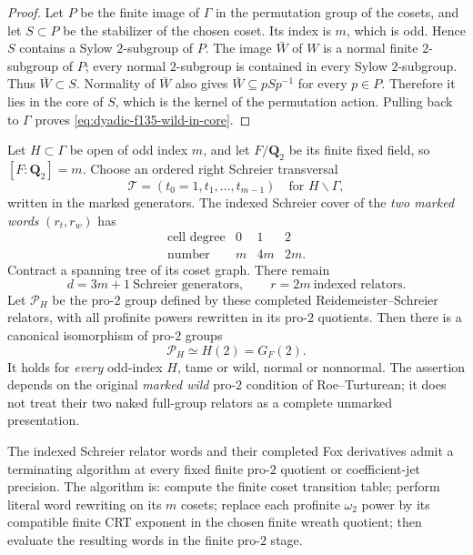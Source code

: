 \begin{proof}
Let $P$ be the finite image of
$\Gamma$ in the permutation group
of the cosets, and let $S\subset P$
be the stabilizer of the chosen
coset.  Its index is $m$, which
is odd.  Hence $S$ contains
a Sylow $2$-subgroup of $P$.
The image $\bar W$ of $W$ is
a normal finite $2$-subgroup
of $P$; every normal $2$-subgroup
is contained in every Sylow
$2$-subgroup.  Thus
$\bar W\subset S$.
Normality of $\bar W$ also gives
$\bar W\subseteq pSp^{-1}$
for every $p\in P$.
Therefore it lies in the core
of $S$, which is the kernel of
the permutation action.
Pulling back to $\Gamma$
proves \eqref{eq:dyadic-f135-wild-in-core}.
\end{proof}

\begin{theorem}
\label{thm:dyadic-f135-uniform-pro2-schreier}
Let $H\subset\Gamma$ be
open of odd index $m$,
and let $F/\mathbf Q_2$
be its finite fixed field,
so $[F:\mathbf Q_2]=m$.
Choose an ordered right
Schreier transversal
\[
\mathscr T=(t_0=1,t_1,\ldots,t_{m-1})
\quad\text{for }H\backslash\Gamma,
\]
written in the marked generators.
The indexed Schreier cover
of the \emph{two marked words}
$(r_t,r_w)$ has
\begin{equation}\label{eq:dyadic-f135-cover-cell-counts}
\boxed{
\begin{array}{c|ccc}
\text{cell degree}&0&1&2\\ \hline
\text{number}&m&4m&2m.
\end{array}}
\end{equation}
Contract a spanning tree
of its coset graph.
There remain
\begin{equation}\label{eq:dyadic-f135-cover-pro2-counts}
\boxed{\quad
d=3m+1\ \text{Schreier generators},
\qquad r=2m\ \text{indexed relators}.
\quad}
\end{equation}
Let $\mathscr P_H$ be the
pro-$2$ group defined by
these completed
Reidemeister--Schreier
relators, with
all profinite powers
rewritten in its
pro-$2$ quotients.
Then there is a
canonical isomorphism
of pro-$2$ groups
\begin{equation}\label{eq:dyadic-f135-marked-wreath-universality}
\boxed{\qquad
\mathscr P_H\simeq H(2)=G_F(2).
\qquad}
\end{equation}
It holds for
\emph{every} odd-index
$H$, tame or wild,
normal or nonnormal.
The assertion depends
on the original
\emph{marked wild}
pro-$2$ condition
of Roe--Turturean;
it does not treat
their two naked
full-group relators
as a complete
unmarked presentation.

The indexed
Schreier relator
words and their
completed Fox
derivatives admit a
terminating algorithm
at every fixed finite
pro-$2$ quotient or
coefficient-jet
precision.  The
algorithm is:
compute the finite
coset transition
table; perform
literal word rewriting
on its $m$ cosets;
replace each
profinite $\omega_2$
power by its
compatible finite
CRT exponent
in the chosen
finite wreath quotient;
then evaluate the
resulting words
in the finite
pro-$2$ stage.
\end{theorem}

